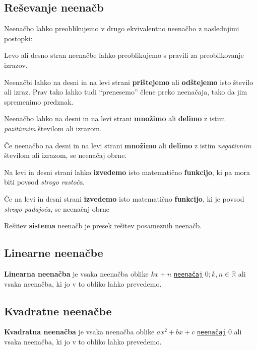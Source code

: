 \documentclass[a4paper,oneside,12pt,fleqn]{article}
\def\R{\ensuremath{\mathbb R}}
\numberwithin{equation}{section}
\newenvironment{itemize*}%
{
\vspace{-12pt}%
\begin{itemize}%
\setlength{\itemsep}{0pt}%
\setlength{\parskip}{2pt}}%
{\end{itemize}}
\begin{document}
\subsection{Reševanje neenačb}
\label{sec:neenac:resev}
Neenačbo lahko preoblikujemo v drugo ekvivalentno neenačbo z naslednjimi postopki:
\begin{itemize*}
  \item Levo ali desno stran neenačbe lahko preoblikujemo s pravili za preoblikovanje
    izrazov.
  \item Neenačbi lahko na desni in na levi strani \textbf{prištejemo} ali \textbf{odštejemo} isto število ali izraz.
Prav tako lahko tudi ``prenesemo'' člene preko neenačaja, tako da jim spremenimo predznak.

  \item Neenačbo lahko na desni in na levi strani \textbf{množimo} ali \textbf{delimo} z istim \textit{pozitivnim} številom
ali izrazom.

  \item Če neenačbo na desni in na levi strani \textbf{množimo} ali \textbf{delimo} z istim \textit{negativnim} številom
ali izrazom, se neenačaj obrne.

  \item Na levi in desni strani lahko \textbf{izvedemo} isto matematično \textbf{funkcijo}, ki pa mora biti povsod 
\textit{strogo rastoča}.

  \item Če na levi in desni strani \textbf{izvedemo} isto matematično \textbf{funkcijo}, ki je povsod \textit{strogo
padajoča}, se neenačaj obrne
\end{itemize*}

Rešitev \textbf{sistema} neenačb je presek rešitev posameznih neenačb.

\subsection{Linearne neenačbe}
\label{sec:neenac:lin}
\textbf{Linearna neenačba} je vsaka neenačba oblike $kx + n$
\hyperlink{point:neenacaj}{\texttt{neenačaj}} $0; k, n \in \R$ ali vsaka
neenačba, ki jo v to obliko lahko prevedemo.

\subsection{Kvadratne neenačbe}
\label{sec:neenac:kvad}
\textbf{Kvadratna neenačba} je vsaka neenačba oblike $ax^2 + bx + c$
\hyperlink{point:neenacaj}{\texttt{neenačaj}} $0$
ali vsaka neenačba, ki jo v to obliko lahko prevedemo.
\end{document}
